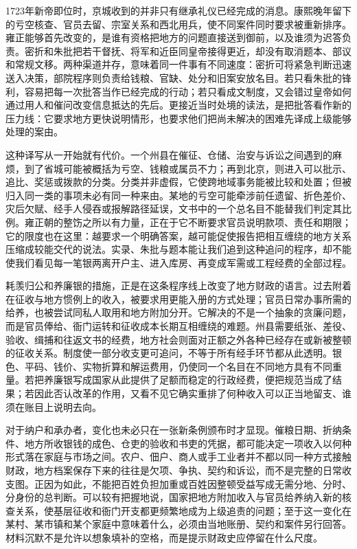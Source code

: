 1723年新帝即位时，京城收到的并非只有继承礼仪已经完成的消息。康熙晚年留下的亏空核查、官员去留、宗室关系和西北用兵，使不同案件同时要求被重新排序。雍正能够首先改变的，是谁有资格把地方的问题直接送到御前，以及谁须为迟答负责。密折和朱批把若干督抚、将军和近臣同皇帝接得更近，却没有取消题本、部议和常规文移。两种渠道并存，意味着同一件事有不同速度：密折可将紧急判断迅速送入决策，部院程序则负责给钱粮、官缺、处分和旧案安放名目。若只看朱批的锋利，容易把每一次批答当作已经完成的行动；若只看成文制度，又会错过皇帝如何通过用人和催问改变信息抵达的先后。更接近当时处境的读法，是把批答看作新的压力线：它要求地方更快说明情形，也要求他们把尚未解决的困难先译成上级能够处理的案由。

这种译写从一开始就有代价。一个州县在催征、仓储、治安与诉讼之间遇到的麻烦，到了省城可能被概括为亏空、钱粮或属员不力；再到北京，则进入可以批示、追比、奖惩或拨款的分类。分类并非虚假，它使跨地域事务能被比较和处置；但被归入同一类的事项未必有同一种来由。某地的亏空可能牵涉前任遗留、折色差价、灾后欠赋、经手人侵吞或报解路径延误，文书中的一个总名目不能替我们判定其比例。雍正朝的整饬之所以有力量，正在于它不断要求官员说明款项、责任和期限；它的限度也在这里：越要求一个明确答案，越可能促使报告把相互缠绕的地方关系压缩成较能交代的说法。实录、朱批与题本能让我们追到这种追问的程序，却不能使我们看见每一笔银两离开户主、进入库房、再变成军需或工程经费的全部过程。

耗羡归公和养廉银的措施，正是在这条程序线上改变了地方财政的语言。过去附着在征收与地方惯例上的收入，被要求用更能入册的方式处理；官员日常办事所需的给养，也被尝试同私人取用和地方附加分开。它解决的不是一个抽象的贪廉问题，而是官员俸给、衙门运转和征收成本长期互相缠绕的难题。州县需要纸张、差役、验收、缉捕和往返文书的经费，地方社会则面对正额之外各种已经存在或新被整顿的征收关系。制度使一部分收支更可追问，不等于所有经手环节都从此透明。银色、平码、钱价、实物折算和解运费用，仍使同一个名目在不同地方具有不同重量。若把养廉银写成国家从此提供了足额而稳定的行政经费，便把规范当成了结果；若因此否认改革的作用，又看不见它确实重排了何种收入可以正当地留支、谁须在账目上说明去向。

对于纳户和承办者，变化也未必只在一张新条例颁布时才显现。催粮日期、折纳条件、地方所收银钱的成色、仓吏的验收和书吏的凭据，都可能决定一项收入以何种形式落在家庭与市场之间。农户、佃户、商人或手工业者并不都以同一种方式接触财政，地方档案保存下来的往往是欠项、争执、契约和诉讼，而不是完整的日常收支图。正因为如此，不能把百姓负担加重或百姓因整顿受益写成无需分地、分时、分身份的总判断。可以较有把握地说，国家把地方附加收入与官员给养纳入新的核查关系，使基层征收和衙门开支都更频繁地成为上级追责的问题；至于这一变化在某村、某市镇和某个家庭中意味着什么，必须由当地账册、契约和案件另行回答。材料沉默不是允许以想象填补的空格，而是提示财政史应停留在什么尺度。

